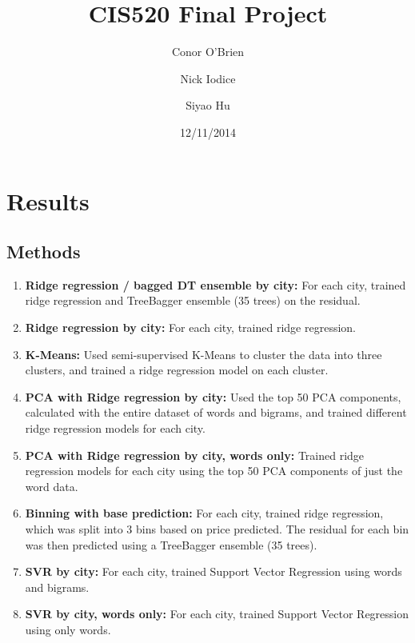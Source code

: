 \documentclass[11pt]{article}
\title{CIS520 Final Project}
\author{Conor O'Brien \and Nick Iodice \and Siyao Hu}
\date{12/11/2014}
\begin{document}
\maketitle

\section{Results}

\subsection*{Methods}
\begin{enumerate}
	\item \textbf{Ridge regression / bagged DT ensemble by city:} For each city, trained ridge regression and TreeBagger ensemble (35 trees) on the residual.
	\item \textbf{Ridge regression by city:} For each city, trained ridge regression.
	\item \textbf{K-Means:} Used semi-supervised K-Means to cluster the data into three clusters, and trained a ridge regression model on each cluster. 
	\item \textbf{PCA with Ridge regression by city:} Used the top 50 PCA components, calculated with the entire dataset of words and bigrams, and trained different  ridge regression models for each city.
	\item \textbf{PCA with Ridge regression by city, words only:} Trained ridge regression models for each city using the top 50 PCA components of just the word data.
	\item \textbf{Binning with base prediction:} For each city, trained ridge regression, which was split into 3 bins based on price predicted. The residual for each bin was then predicted using a TreeBagger ensemble (35 trees).
	\item \textbf{SVR by city:} For each city, trained Support Vector Regression using words and bigrams.
	\item \textbf{SVR by city, words only:} For each city, trained Support Vector Regression using only words.
\end{enumerate}
\end{document}

